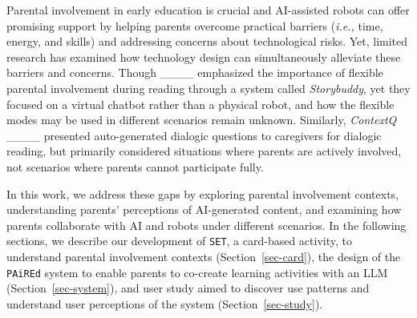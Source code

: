 Parental involvement in early education is crucial and AI-assisted robots can offer promising support by helping parents overcome practical barriers (\textit{i.e.,} time, energy, and skills) and addressing concerns about technological risks. Yet, limited research has examined how technology design can simultaneously alleviate these barriers and concerns. Though ____ emphasized the importance of flexible parental involvement during reading through a system called \textit{Storybuddy}, yet they focused on a virtual chatbot rather than a physical robot, and how the flexible modes may be used in different scenarios remain unknown. Similarly, \textit{ContextQ} ____ presented auto-generated dialogic questions to caregivers for dialogic reading, but primarily considered situations where parents are actively involved, not scenarios where parents cannot participate fully.

In this work, we address these gaps by exploring parental involvement contexts, understanding parents' perceptions of AI-generated content, and examining how parents collaborate with AI and robots under different scenarios. In the following sections, we describe our development of  \texttt{SET}, a card-based activity, to understand parental involvement contexts (Section~\ref{sec-card}), the design of the \texttt{PAiREd} system to enable parents to co-create learning activities with an LLM (Section~\ref{sec-system}), and user study aimed to discover use patterns and understand user perceptions of the system (Section~\ref{sec-study}).